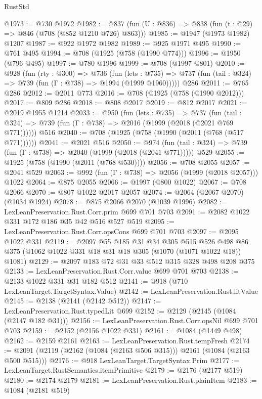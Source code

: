 \begin{lexlean}{RustStd}
\begin{coremodule}
@1973 := @730 @1972
@1982 := @837 (fun (U : @836) => @838 (fun (t : @29) => @846 (@708 (@852 @1210 @726) @863)))
@1985 := @1947 (@1973 @1982) @1207
@1987 := @922 @1972 @1982
@1989 := @925 @1971 @495
@1990 := @761 @495
@1994 := @708 (@1925 (@758 (@1990 @774)))
@1996 := @1950 (@796 @495)
@1997 := @780 @1996
@1999 := @708 (@1997 @801)
@2010 := @928
    (fun (rty : @300) =>
    @736
      (fun (lets : @735) =>
      @737 (fun (tail : @324) => @739 (fun (Γ : @738) => @1994 (@1999 @1960)))))
    @286
@2011 := @765 @286
@2012 := @2011 @773
@2016 := @708 (@1925 (@758 (@1990 @2012)))
@2017 := @809 @286
@2018 := @808 @2017
@2019 := @812 @2017
@2021 := @2019 @1955 @1214
@2033 := @950
    (fun (lets : @735) =>
    @737 (fun (tail : @324) => @739 (fun (Γ : @738) => @2016 (@1999 (@2018 (@2021 @769 @771))))))
    @516
@2040 := @708 (@1925 (@758 (@1990 (@2011 (@768 (@517 @771))))))
@2041 := @2021 @516
@2050 := @974
    (fun (tail : @324) => @739 (fun (Γ : @738) => @2040 (@1999 (@2018 (@2041 @771)))))
    @529
@2055 := @1925 (@758 (@1990 (@2011 (@768 @530))))
@2056 := @708 @2055
@2057 := @2041 @529
@2063 := @992 (fun (Γ : @738) => @2056 (@1999 (@2018 @2057))) @1022
@2064 := @875 @2055
@2066 := @1997 (@800 @1022)
@2067 := @708 @2066
@2070 := @807 @1022 @2017 @2057
@2074 := @2064 (@2067 @2070) (@1034 @1924)
@2078 := @875 @2066 @2070 (@1039 @1996)
@2082 := LexLeanPreservation.Rust.Corr.prim @699 @701 @703
@2091 := @2082 @1022 @331 @172 @186 @35 @42 @516 @527 @519
@2095 := LexLeanPreservation.Rust.Corr.opsCons @699 @701 @703
@2097 := @2095 @1022 @331
@2119 := @2097
    @55
    @185
    @31
    @34
    @305
    @515
    @526
    @498
    @86
    @375
    (@1062 @1022 @331 @18 @31 @18 @305 (@1070 (@1071 @1022 @18)) @1081)
@2129 := @2097 @183 @72 @31 @33 @512 @315 @328 @498 @208 @375
@2133 := LexLeanPreservation.Rust.Corr.value @699 @701 @703
@2138 := @2133 @1022 @331 @31 @182 @512
@2141 := @918 (@710 LexLeanTarget.TargetSyntax.Value)
@2142 := LexLeanPreservation.Rust.litValue
@2145 := @2138 (@2141 (@2142 @512))
@2147 := LexLeanPreservation.Rust.typedLit @699
@2152 := @2129 (@2145 (@1084 (@2147 @182 @31)))
@2156 := LexLeanPreservation.Rust.Corr.opsNil @699 @701 @703
@2159 := @2152 (@2156 @1022 @331)
@2161 := @1084 (@1449 @498)
@2162 := @2159 @2161
@2163 := LexLeanPreservation.Rust.tempFresh
@2174 := @2091 (@2119 (@2162 (@1084 (@2163 @506 @315))) @2161 (@1084 (@2163 @500 @515)))
@2176 := @918 LexLeanTarget.TargetSyntax.Prim
@2177 := LexLeanTarget.RustSemantics.itemPrimitive
@2179 := @2176 (@2177 @519)
@2180 := @2174 @2179
@2181 := LexLeanPreservation.Rust.plainItem
@2183 := @1084 (@2181 @519)

\end{coremodule}
\end{lexlean}
